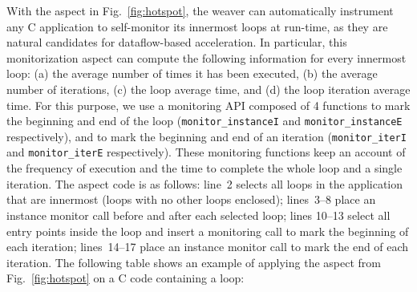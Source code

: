 \noindent With the aspect in Fig.~\ref{fig:hotspot}, the weaver can
automatically instrument any C application to self-monitor its
innermost loops at run-time, as they are natural candidates for
dataflow-based acceleration. In particular, this monitorization aspect
can compute the following information for every innermost loop: (a)
the average number of times it has been executed, (b) the average
number of iterations, (c) the loop average time, and (d) the loop
iteration average time. For this purpose, we use a monitoring API
composed of 4 functions to mark the beginning and end of the loop
(\texttt{monitor\_instanceI} and \texttt{monitor\_instanceE}
respectively), and to mark the beginning and end of an iteration
(\texttt{monitor\_iterI} and \texttt{monitor\_iterE}
respectively). These monitoring functions keep an account of the
frequency of execution and the time to complete the whole loop and a
single iteration.  The aspect code is as follows: line~2 selects all
loops in the application that are innermost (loops with no other loops
enclosed); lines~3--8 place an instance monitor call before and after
each selected loop; lines 10--13 select all entry points inside the
loop and insert a monitoring call to mark the beginning of each
iteration; lines~14--17 place an instance monitor call to mark the end
of each iteration. The following table shows an example of applying
the aspect from Fig.~\ref{fig:hotspot} on a C code containing a loop:
\vspace{2mm}


